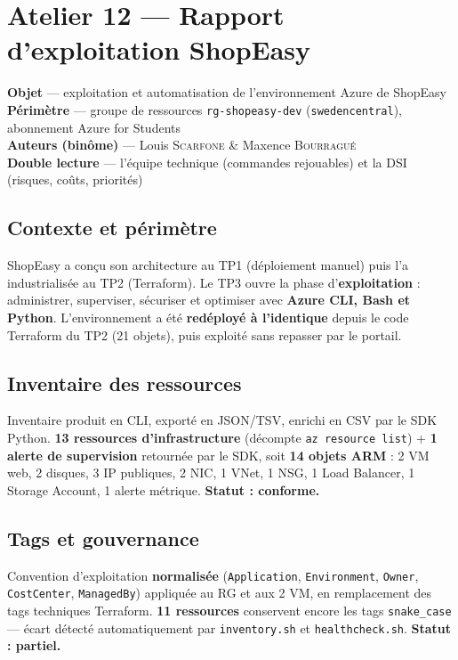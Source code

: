 \documentclass[11pt,a4paper]{article}
\newcommand{\code}[1]{\texttt{#1}}
\begin{document}
\section{Atelier 12 — Rapport d'exploitation ShopEasy}

\begin{tcolorbox}[enhanced, sharp corners, boxrule=0pt, leftrule=4pt, colback=azurepale, colframe=azuredark,
   left=4.5mm,right=4.5mm,top=3.6mm,bottom=3.6mm, before skip=10pt, after skip=12pt]
\textbf{Objet} — exploitation et automatisation de l'environnement Azure de ShopEasy\\[2pt]
\textbf{Périmètre} — groupe de ressources \code{rg-shopeasy-dev} (\code{swedencentral}), abonnement Azure for Students\\[2pt]
\textbf{Auteurs (binôme)} — Louis \textsc{Scarfone} \& Maxence \textsc{Bourragué}\\[2pt]
\textbf{Double lecture} — l'équipe technique (commandes rejouables) et la DSI (risques, coûts, priorités)
\end{tcolorbox}

\subsection{Contexte et périmètre}
ShopEasy a conçu son architecture au TP1 (déploiement manuel) puis l'a industrialisée au TP2 (Terraform). Le TP3 ouvre la phase d'\textbf{exploitation} : administrer, superviser, sécuriser et optimiser avec \textbf{Azure CLI, Bash et Python}. L'environnement a été \textbf{redéployé à l'identique} depuis le code Terraform du TP2 (21 objets), puis exploité sans repasser par le portail.

\subsection{Inventaire des ressources}
Inventaire produit en CLI, exporté en JSON/TSV, enrichi en CSV par le SDK Python. \textbf{13 ressources d'infrastructure} (décompte \code{az resource list}) + \textbf{1 alerte de supervision} retournée par le SDK, soit \textbf{14 objets ARM} : 2 VM web, 2 disques, 3 IP publiques, 2 NIC, 1 VNet, 1 NSG, 1 Load Balancer, 1 Storage Account, 1 alerte métrique. \textbf{Statut : conforme.}

\subsection{Tags et gouvernance}
Convention d'exploitation \textbf{normalisée} (\code{Application}, \code{Environment}, \code{Owner}, \code{CostCenter}, \code{ManagedBy}) appliquée au RG et aux 2 VM, en remplacement des tags techniques Terraform. \textbf{11 ressources} conservent encore les tags \code{snake\_case} — écart détecté automatiquement par \code{inventory.sh} et \code{healthcheck.sh}. \textbf{Statut : partiel.}
\end{document}
